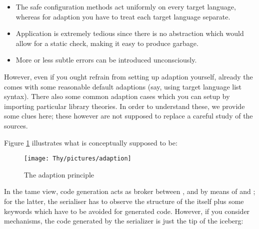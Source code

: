 \begin{isabellebody}
\begin{isamarkuptext}
  \begin{itemize}
    \item The safe configuration methods act uniformly on every target language,
      whereas for adaption you have to treat each target language separate.
    \item Application is extremely tedious since there is no abstraction
      which would allow for a static check, making it easy to produce garbage.
    \item More or less subtle errors can be introduced unconsciously.
  \end{itemize}

  \noindent However, even if you ought refrain from setting up adaption
  yourself, already the  comes with some reasonable default
  adaptions (say, using target language list syntax).  There also some
  common adaption cases which you can setup by importing particular
  library theories.  In order to understand these, we provide some clues here;
  these however are not supposed to replace a careful study of the sources.%
\end{isamarkuptext}%
\isamarkuptrue%
%
\isamarkuptrue%
%
\begin{isamarkuptext}%
Figure \ref{fig:adaption} illustrates what  is conceptually
  supposed to be:

  \begin{figure}[here]
    \texttt{[image: Thy/pictures/adaption]}
    \caption{The adaption principle}
    \label{fig:adaption}
  \end{figure}

  \noindent In the tame view, code generation acts as broker between
  ,  and
   by means of  and
  ;  for the latter, the serialiser has to observe
  the structure of the  itself plus some 
  keywords which have to be avoided for generated code.
  However, if you consider  mechanisms, the code generated
  by the serializer is just the tip of the iceberg:


\end{isamarkuptext}
\end{isabellebody}
